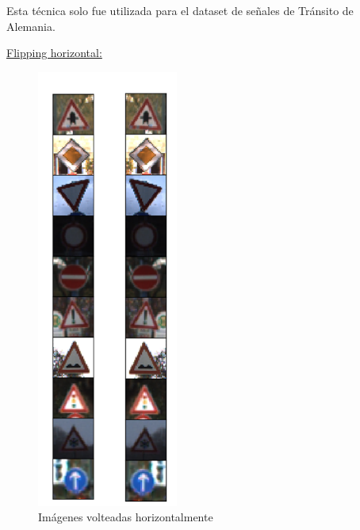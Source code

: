 			Esta técnica solo fue utilizada para el dataset de señales de Tránsito de Alemania.
			\newpage
			\begin{multicols}{2}
				
				\underline{Flipping horizontal:}
				\begin{figure}[H]
					\begin{center}
					\includegraphics[height=14.5cm ]{images/desarrollo/Augment/flippedHorizontally}
					\end{center}
					\begin{center}
					\caption{\small{Imágenes volteadas horizontalmente}}
					{\small{\fontsize{10}{16.8}\selectfont {Fuente: Elaboración propia}}}
					\end{center}
					\vspace{-1.5em}
				\end{figure}

			

\end{multicols}
